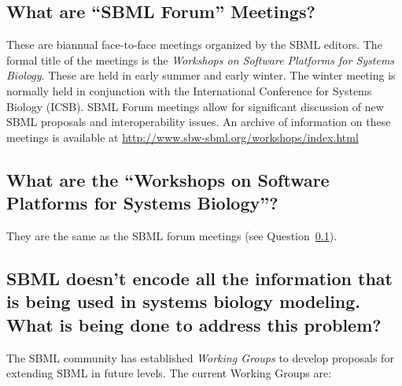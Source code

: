 \documentclass{sbmlfaq}
\begin{document}
\subsection{What are ``SBML Forum'' Meetings?}
\label{sec:forums}

These are biannual face-to-face meetings organized by the SBML editors.
The formal title of the meetings is the \emph{Workshops on Software
  Platforms for Systems Biology}.  These are held in early summer and early
winter.  The winter meeting is normally held in conjunction with the
International Conference for Systems Biology (ICSB).  SBML Forum meetings
allow for significant discussion of new SBML proposals and interoperability
issues.  An archive of information on these meetings is available at
\url{http://www.sbw-sbml.org/workshops/index.html}

\subsection{What are the ``Workshops on Software Platforms for Systems Biology''?}

They are the same as the SBML forum meetings (see Question~\ref{sec:forums}).


\subsection{SBML doesn't encode all the information that is
  being used in systems biology modeling.  What is being done to address
  this problem?}
\label{sec:workinggroups}

The SBML community has established \emph{Working Groups} to develop
proposals for extending SBML in future levels.  The current Working Groups
are:
\end{document}

